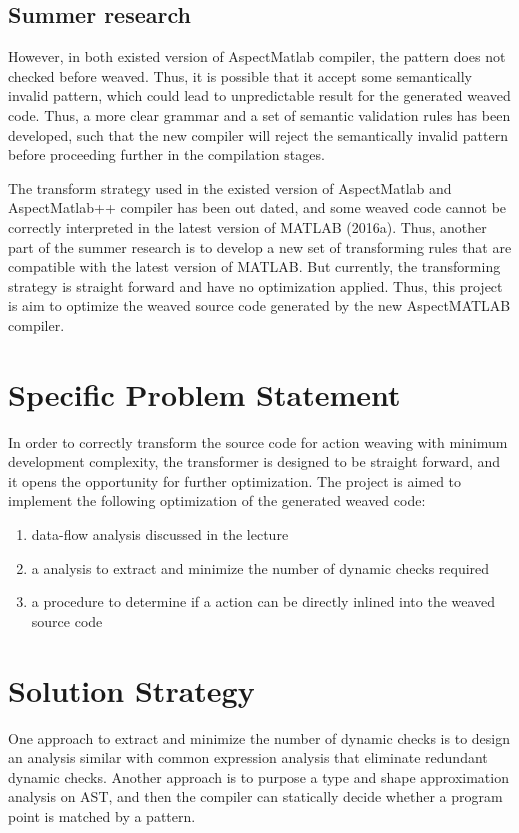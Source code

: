 \documentclass{comp621}
\begin{document}
\subsection*{Summer research}
However, in both existed version of AspectMatlab compiler, the pattern does not
checked before weaved. Thus, it is possible that it accept some semantically
invalid pattern, which could lead to unpredictable result for the generated
weaved code. Thus, a more clear grammar and a set of semantic validation rules
has been developed, such that the new compiler will reject the semantically
invalid pattern before proceeding further in the compilation stages.

The transform strategy used in the existed version of AspectMatlab and
AspectMatlab++ compiler has been out dated, and some weaved code cannot be
correctly interpreted in the latest version of MATLAB (2016a). Thus, another
part of the summer research is to develop a new set of transforming rules that
are compatible with the latest version of MATLAB. But currently, the
transforming strategy is straight forward and have no optimization applied.
Thus, this project is aim to optimize the weaved source code generated by the
new AspectMATLAB compiler.

\section{Specific Problem Statement}

In order to correctly transform the source code for action weaving with minimum
development complexity, the transformer is designed to be straight forward, and
it opens the opportunity for further optimization. The project is aimed to
implement the following optimization of the generated weaved code:
\begin{enumerate}
    \item data-flow analysis discussed in the lecture
    \item a analysis to extract and minimize the number of dynamic checks
          required
    \item a procedure to determine if a action can be directly inlined into the
          weaved source code
\end{enumerate}

\section{Solution Strategy}
One approach to extract and minimize the number of dynamic checks is to design
an analysis similar with common expression analysis that eliminate redundant
dynamic checks. Another approach is to purpose a type and shape approximation
analysis on AST, and then the compiler can statically decide whether a program
point is matched by a pattern.
\end{document}
